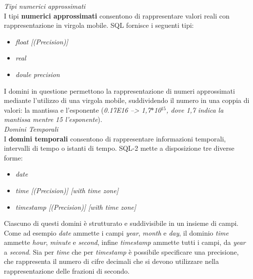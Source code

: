 \documentclass{article}
\begin{document}
\textit{Tipi numerici approssimati}\\I tipi \textbf{numerici approssimati} consentono di rappresentare valori reali con rappresentazione in virgola mobile. SQL fornisce i seguenti tipi:
\begin{itemize}[label={ }, leftmargin=1cm]
    \itemsep0em
    \item \textit{float [(Precision)]}
    \item \textit{real}
    \item \textit{doule precision}
\end{itemize}
I domini in questione permettono la rappresentazione di numeri approssimati mediante l'utilizzo di una virgola mobile, suddividendo il numero in una coppia di valori: la mantissa e l'esponente (\textit{0.17E16 --> 1,7$*$10$^{15}$, dove 1,7 indica la mantissa mentre 15 l'esponente}).\vspace*{14pt}\\
\textit{Domini Temporali}\\I \textbf{domini temporali} consentono di rappresentare informazioni temporali, intervalli di tempo o istanti di tempo. SQL-2 mette a disposizione tre diverse forme:
\begin{itemize}[label={ }, leftmargin=1cm]
    \itemsep0em
    \item \textit{date}
    \item \textit{time [(Precision)] [with time zone]}
    \item \textit{timestamp [(Precision)] [with time zone]}
\end{itemize} 
Ciascuno di questi domini è strutturato e suddivisibile in un insieme di campi. Come ad esempio \textit{date} ammette i campi \textit{year}, \textit{month} e \textit{day}, il dominio \textit{time} ammette \textit{hour}, \textit{minute} e \textit{second}, infine \textit{timestamp} ammette tutti i campi, da \textit{year} a \textit{second}. Sia per \textit{time} che per \textit{timestamp} è possibile specificare una precisione, che rappresenta il numero di cifre decimali che si devono utilizzare nella rappresentazione delle frazioni di secondo.
\end{document}
